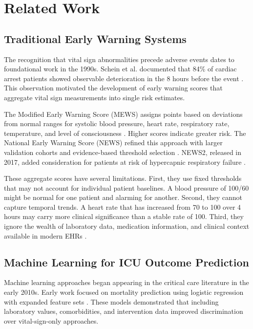 \section{Related Work}

\subsection{Traditional Early Warning Systems}

The recognition that vital sign abnormalities precede adverse events dates to foundational work in the 1990s. Schein et al. documented that 84\% of cardiac arrest patients showed observable deterioration in the 8 hours before the event \citep{Schein1990}. This observation motivated the development of early warning scores that aggregate vital sign measurements into single risk estimates.

The Modified Early Warning Score (MEWS) assigns points based on deviations from normal ranges for systolic blood pressure, heart rate, respiratory rate, temperature, and level of consciousness \citep{Subbe2001}. Higher scores indicate greater risk. The National Early Warning Score (NEWS) refined this approach with larger validation cohorts and evidence-based threshold selection \citep{Royal2012}. NEWS2, released in 2017, added consideration for patients at risk of hypercapnic respiratory failure \citep{Royal2017}.

These aggregate scores have several limitations. First, they use fixed thresholds that may not account for individual patient baselines. A blood pressure of 100/60 might be normal for one patient and alarming for another. Second, they cannot capture temporal trends. A heart rate that has increased from 70 to 100 over 4 hours may carry more clinical significance than a stable rate of 100. Third, they ignore the wealth of laboratory data, medication information, and clinical context available in modern EHRs \citep{Churpek2014}.

\subsection{Machine Learning for ICU Outcome Prediction}

Machine learning approaches began appearing in the critical care literature in the early 2010s. Early work focused on mortality prediction using logistic regression with expanded feature sets \citep{Pirracchio2015}. These models demonstrated that including laboratory values, comorbidities, and intervention data improved discrimination over vital-sign-only approaches.

